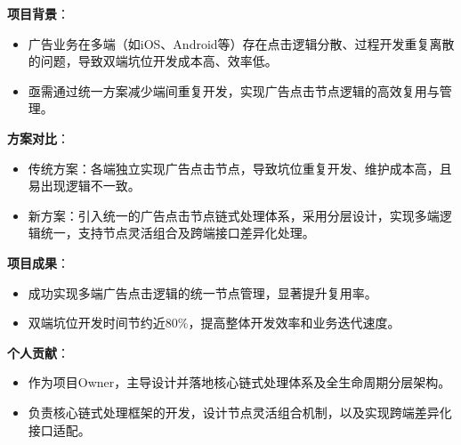 \documentclass[]{deedy-resume-openfont}
\begin{document}
\begin{minipage}[t]{0.75\textwidth}
\vspace{0.1em}
\vspace{0.1em}
\begin{tightemize}
    \item \textbf{项目背景}：
        \begin{itemize}
            \item 广告业务在多端（如iOS、Android等）存在点击逻辑分散、过程开发重复离散的问题，导致双端坑位开发成本高、效率低。
            \item 亟需通过统一方案减少端间重复开发，实现广告点击节点逻辑的高效复用与管理。
        \end{itemize}
    \item \textbf{方案对比}：
        \begin{itemize}
            \item 传统方案：各端独立实现广告点击节点，导致坑位重复开发、维护成本高，且易出现逻辑不一致。
            \item 新方案：引入统一的广告点击节点链式处理体系，采用分层设计，实现多端逻辑统一，支持节点灵活组合及跨端接口差异化处理。
        \end{itemize}
    \item \textbf{项目成果}：
        \begin{itemize}
            \item 成功实现多端广告点击逻辑的统一节点管理，显著提升复用率。
            \item 双端坑位开发时间节约近80\%，提高整体开发效率和业务迭代速度。
        \end{itemize}
    \item \textbf{个人贡献}：
        \begin{itemize}
            \item 作为项目Owner，主导设计并落地核心链式处理体系及全生命周期分层架构。
            \item 负责核心链式处理框架的开发，设计节点灵活组合机制，以及实现跨端差异化接口适配。
        \end{itemize}
\end{tightemize}
\sectionsep
\end{minipage} 
\end{document}
